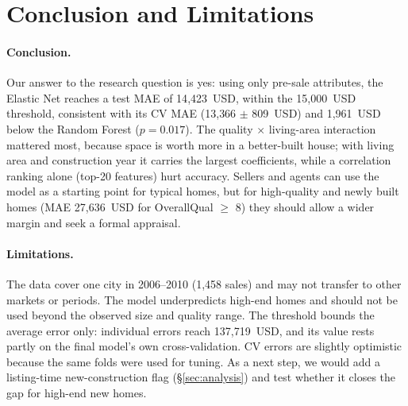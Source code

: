 \section{Conclusion and Limitations}
\label{sec:conclusion}

\paragraph{Conclusion.}
Our answer to the research question is yes: using only pre-sale attributes, the Elastic Net reaches a test MAE of 14{,}423~USD, within the 15{,}000~USD threshold, consistent with its CV MAE (13{,}366 $\pm$ 809~USD) and 1{,}961~USD below the Random Forest ($p = 0.017$).
The quality $\times$ living-area interaction mattered most, because space is worth more in a better-built house; with living area and construction year it carries the largest coefficients, while a correlation ranking alone (top-20 features) hurt accuracy.
Sellers and agents can use the model as a starting point for typical homes, but for high-quality and newly built homes (MAE 27{,}636~USD for OverallQual $\geq$ 8) they should allow a wider margin and seek a formal appraisal.

\paragraph{Limitations.}
The data cover one city in 2006--2010 (1{,}458 sales) and may not transfer to other markets or periods.
The model underpredicts high-end homes and should not be used beyond the observed size and quality range.
The threshold bounds the average error only: individual errors reach 137{,}719~USD, and its value rests partly on the final model's own cross-validation.
CV errors are slightly optimistic because the same folds were used for tuning.
As a next step, we would add a listing-time new-construction flag (\S\ref{sec:analysis}) and test whether it closes the gap for high-end new homes.
